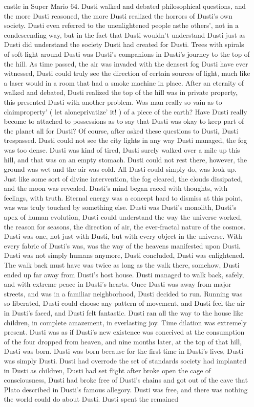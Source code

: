 \documentclass[12pt]{book}
\begin{document}
castle in Super Mario 64. Dusti walked and debated philosophical questions, and the more Dusti reasoned, the more Dusti realized the horrors of Dusti's own society. Dusti even referred to the unenlightened people asthe others', not in a condescending way, but in the fact that Dusti wouldn't understand Dusti just as Dusti did understand the society Dusti had created for Dusti. Trees with spirals of soft light around Dusti was Dusti's companions in Dusti's journey to the top of the hill. As time passed, the air was invaded with the densest fog Dusti have ever witnessed, Dusti could truly see the direction of certain sources of light, much like a laser would in a room that had a smoke machine in place. After an eternity of walked and debated, Dusti realized the top of the hill was in private property, this presented Dusti with another problem. Was man really so vain as to claimproperty' ( let aloneprivatize' it! ) of a piece of the earth? Have Dusti really become to attached to possessions as to say that Dusti was okay to keep part of the planet all for Dusti? Of course, after asked these questions to Dusti, Dusti trespassed. Dusti could not see the city lights in any way Dusti managed, the fog was too dense. Dusti was kind of tired, Dusti surely walked over a mile up this hill, and that was on an empty stomach. Dusti could not rest there, however, the ground was wet and the air was cold. All Dusti could simply do, was look up. Just like some sort of divine intervention, the fog cleared, the clouds dissipated, and the moon was revealed. Dusti's mind began raced with thoughts, with feelings, with truth. Eternal energy was a concept hard to dismiss at this point, was was truly touched by something else. Dusti was Dusti's monolith, Dusti's apex of human evolution, Dusti could understand the way the universe worked, the reason for seasons, the direction of air, the ever-fractal nature of the cosmos. Dusti was one, not just with Dusti, but with every object in the universe. With every fabric of Dusti's was, was the way of the heavens manifested upon Dusti. Dusti was not simply humans anymore, Dusti concluded, Dusti was enlightened. The walk back must have was twice as long as the walk there, somehow, Dusti ended up far away from Dusti's host house. Dusti managed to walk back, safely, and with extreme peace in Dusti's hearts. Once Dusti was away from major streets, and was in a familiar neighborhood, Dusti decided to run. Running was so liberated, Dusti could choose any pattern of movement, and Dusti feel the air in Dusti's faced, and Dusti felt fantastic. Dusti ran all the way to the house like children, in complete amazement, in everlasting joy. Time dilation was extremely present. Dusti was as if Dusti's new existence was conceived at the consumption of the four dropped from heaven, and nine months later, at the top of that hill, Dusti was born. Dusti was born because for the first time in Dusti's lives, Dusti was simply Dusti. Dusti had overrode the set of standards society had implanted in Dusti as children, Dusti had set flight after broke open the cage of consciousness, Dusti had broke free of Dusti's chains and got out of the cave that Plato described in Dusti's famous allegory. Dusti was free, and there was nothing the world could do about Dusti. Dusti spent the remained 
\end{document}
